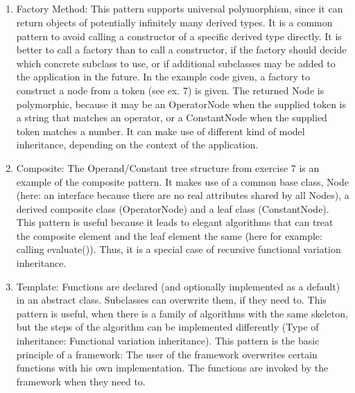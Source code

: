\subsection{}

\begin{enumerate}
\item Factory Method: This pattern supports universal polymorphism, since it can return objects of potentially infinitely many derived types. It is a common pattern to avoid calling a constructor of a specific derived type directly. It is better to call a factory than to call a constructor, if the factory should decide which concrete subclass to use, or if additional subclasses may be added to the application in the future. In the example code given, a factory to construct a node from a token (see ex. 7) is given. The returned Node is polymorphic, because it may be an OperatorNode when the supplied token is a string that matches an operator, or a ConstantNode when the supplied token matches a number. It can make use of different kind of model inheritance, depending on the context of the application.
\item Composite: The Operand/Constant tree structure from exercise 7 is an example of the composite pattern. It makes use of a common base class, Node (here: an interface because there are no real attributes shared by all Nodes), a derived composite class (OperatorNode) and a leaf class (ConstantNode). This pattern is useful because it leads to elegant algorithms that can treat the composite element and the leaf element the same (here for example: calling evaluate()). Thus, it is a special case of recursive functional variation inheritance.
\item Template: Functions are declared (and optionally implemented as a default) in an abstract class. Subclasses can overwrite them, if they need to. This pattern is useful, when there is a family of algorithms with the same skeleton, but the steps of the algorithm can be implemented differently (Type of inheritance: Functional variation inheritance). This pattern is the basic principle of a framework: The user of the framework overwrites certain functions with his own implementation. The functions are invoked by the framework when they need to.
\end{enumerate}